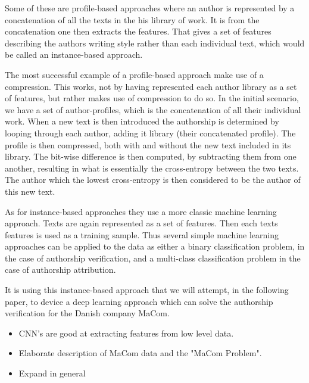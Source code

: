 Some of these are profile-based approaches where an author is represented by
a concatenation of all the texts in the his library of work. It is from the
concatenation one then extracts the features. That gives a set of features
describing the authors writing style rather than each individual text, which
would be called an instance-based approach.

The most successful example of a profile-based approach make use of a
compression. This works, not by having represented each author library as a
set of features, but rather makes use of compression to do so. In the initial
scenario, we have a set of author-profiles, which is the concatenation of
all their individual work. When a new text is then introduced the authorship
is determined by looping through each author, adding it library (their
concatenated profile). The profile is then compressed, both with and without
the new text included in its library. The bit-wise difference is then computed,
by subtracting them from one another, resulting in what is essentially the
cross-entropy between the two texts. The author which the lowest cross-entropy
is then considered to be the author of this new text.

As for instance-based approaches they use a more classic machine learning
approach. Texts are again represented as a set of features. Then each texts
features is used as a training sample. Thus several simple machine learning
approaches can be applied to the data as either a binary classification problem,
in the case of authorship verification, and a multi-class classification problem
in the case of authorship attribution.

It is using this instance-based approach that we will attempt, in the following
paper, to device a deep learning approach which can solve the authorship
verification for the Danish company MaCom.


\begin{itemize}
    \item CNN's are good at extracting features from low level data.
    \item Elaborate description of MaCom data and the "MaCom Problem".
    \item Expand in general
\end{itemize}
